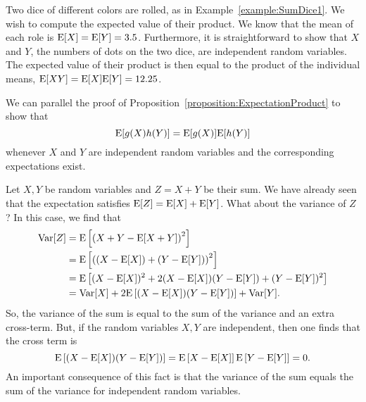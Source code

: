 \begin{example}
Two dice of different colors are rolled, as in Example~\ref{example:SumDice1}.
We wish to compute the expected value of their product.
We know that the mean of each role is $\mathrm{E} [X] = \mathrm{E} [Y] = 3.5$.
Furthermore, it is straightforward to show that $X$ and $Y$, the numbers of dots on the two dice, are independent random variables.
The expected value of their product is then equal to the product of the individual means, $\mathrm{E} [XY] = \mathrm{E} [X] \mathrm{E} [Y] = 12.25$.
\end{example}

We can parallel the proof of Proposition~\ref{proposition:ExpectationProduct} to show that
\begin{equation} \label{equation:DiscreteProduct}
\mathrm{E}[ g(X) h(Y) ] = \mathrm{E} [ g(X) ] \mathrm{E} [ h(Y) ]
\end{equation}
whenever $X$ and $Y$ are independent random variables and the corresponding expectations exist.

\begin{example}
Let $X,Y$ be random variables and $Z=X+Y$ be their sum.
We have already seen that the expectation satisfies $\mathrm{E} [Z] = \mathrm{E}[X] + \mathrm{E}[Y]$.
What about the variance of $Z$?
In this case, we find that
\begin{align*}
\mathrm{Var} [Z]
&= \mathrm{E} \left[ \left(X+Y - \mathrm{E}[X+Y] \right)^2  \right] \\
&= \mathrm{E} \left[ \left((X-\mathrm{E}[X]) + (Y-\mathrm{E}[Y]) \right)^2  \right] \\
&= \mathrm{E} \left[ (X-\mathrm{E}[X])^2 + 2(X-\mathrm{E}[X])(Y-\mathrm{E}[Y]) + (Y-\mathrm{E}[Y])^2 \right] \\
&= \mathrm{Var}[X] + 2 \mathrm{E} \left[(X-\mathrm{E}[X])(Y-\mathrm{E}[Y])\right] + \mathrm{Var}[Y] . 
\end{align*}
So, the variance of the sum is equal to the sum of the variance and an extra cross-term.
But, if the random variables $X,Y$ are independent, then one finds that the cross term is
\[ \mathrm{E} \left[(X-\mathrm{E}[X])(Y-\mathrm{E}[Y])\right] = \mathrm{E} \left[X-\mathrm{E}[X] \right] \mathrm{E}\left[Y-\mathrm{E}[Y]\right] = 0. \]
An important consequence of this fact is that the variance of the sum equals the sum of the variance for independent random variables.
\end{example}

